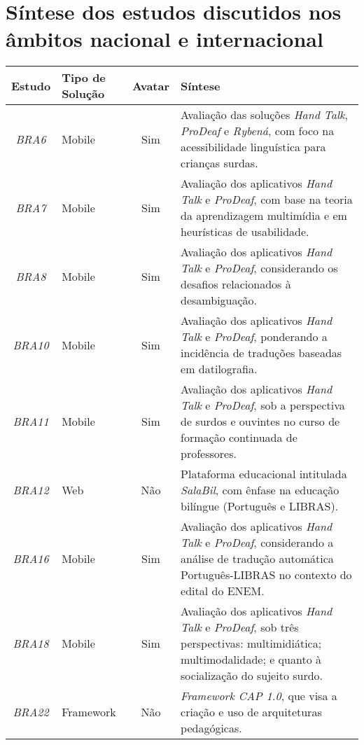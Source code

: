 \chapter{Síntese dos estudos discutidos nos âmbitos nacional e internacional}
\label{apendice:estudos-primarios}

\begin{small}
\setlength\tabcolsep{0.1cm}
\begin{longtable}{|c|C{2.75cm}|c|L{10cm}|}
\hline
\textbf{Estudo} & \textbf{Tipo de Solução} & \textbf{Avatar} & \textbf{Síntese} \\ \hline
\textit{BRA6} & Mobile & Sim & Avaliação das soluções \textit{Hand Talk}, \textit{ProDeaf} e \textit{Rybená}, com foco na acessibilidade linguística para crianças surdas. \\ \hline
\textit{BRA7} & Mobile & Sim & Avaliação dos aplicativos \textit{Hand Talk} e \textit{ProDeaf}, com base na teoria da aprendizagem multimídia e em heurísticas de usabilidade. \\ \hline
\textit{BRA8} & Mobile & Sim & Avaliação dos aplicativos \textit{Hand Talk} e \textit{ProDeaf}, considerando os desafios relacionados à desambiguação. \\ \hline
\textit{BRA10} & Mobile & Sim & Avaliação dos aplicativos \textit{Hand Talk} e \textit{ProDeaf}, ponderando a incidência de traduções baseadas em datilografia. \\ \hline
\textit{BRA11} & Mobile & Sim & Avaliação dos aplicativos \textit{Hand Talk} e \textit{ProDeaf}, sob a perspectiva de surdos e ouvintes no curso de formação continuada de professores. \\ \hline
\textit{BRA12} & Web & Não & Plataforma educacional intitulada \textit{SalaBil}, com ênfase na educação bilíngue (Português e LIBRAS). \\ \hline
\textit{BRA16} & Mobile & Sim & Avaliação dos aplicativos \textit{Hand Talk} e \textit{ProDeaf}, considerando a análise de tradução automática Português-LIBRAS no contexto do edital do ENEM. \\ \hline
\textit{BRA18} & Mobile & Sim & Avaliação dos aplicativos \textit{Hand Talk} e \textit{ProDeaf}, sob três perspectivas: multimidiática; multimodalidade; e quanto à socialização do sujeito surdo. \\ \hline
\textit{BRA22} & Framework & Não & \textit{Framework CAP 1.0}, que visa a criação e uso de arquiteturas pedagógicas. \\ \hline

\end{longtable}
\end{small}
